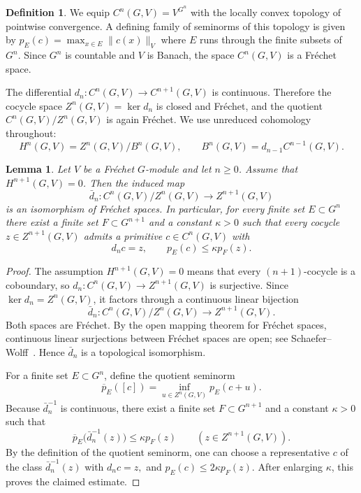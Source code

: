 \documentclass[12pt]{amsproc}
\theoremstyle{plain}
\newtheorem{lemma}[theorem]{Lemma}
\theoremstyle{definition}
\newtheorem{definition}[theorem]{Definition}
\numberwithin{equation}{section}
\begin{document}
\begin{definition}
We equip $C^n(G,V)=V^{G^n}$ with the locally convex topology of pointwise convergence. A defining family of seminorms of this topology is given by
$
p_{E}(c)=\max_{x\in E}\|c(x)\|_V
$
where $E$ runs through the finite subsets of $G^n$. Since $G^n$ is countable and $V$ is Banach, the space $C^n(G,V)$ is a Fr\'echet space.
\end{definition}

The differential $d_n\colon C^n(G,V)\to C^{n+1}(G,V)$ is continuous. Therefore the cocycle space $Z^n(G,V)=\ker d_n$ is closed and Fr\'echet, and the quotient $C^n(G,V)/Z^n(G,V)$ is again Fr\'echet. We use unreduced cohomology throughout:
\[
H^n(G,V)=Z^n(G,V)/B^n(G,V),
\qquad
B^n(G,V)=d_{n-1}C^{n-1}(G,V).
\]

\begin{lemma}\label{lem:openmapping}
Let $V$ be a Fr\'echet $G$-module and let $n\ge 0$. Assume that $H^{n+1}(G,V)=0$. Then the induced map
\[
\bar d_n\colon C^n(G,V)/Z^n(G,V)\to Z^{n+1}(G,V)
\]
is an isomorphism of Fr\'echet spaces. In particular, for every finite set $E\subset G^n$ there exist a finite set $F\subset G^{n+1}$ and a constant $\kappa>0$ such that every cocycle $z\in Z^{n+1}(G,V)$ admits a primitive $c\in C^n(G,V)$ with
\[
d_nc=z,
\qquad
p_E(c)\le \kappa p_F(z).
\]
\end{lemma}

\begin{proof}
The assumption $H^{n+1}(G,V)=0$ means that every $(n+1)$-cocycle is a coboundary, so $d_n\colon C^n(G,V)\to Z^{n+1}(G,V)$ is surjective. Since $\ker d_n=Z^n(G,V)$, it factors through a continuous linear bijection
\[
\bar d_n\colon C^n(G,V)/Z^n(G,V)\to Z^{n+1}(G,V).
\]
Both spaces are Fr\'echet. By the open mapping theorem for Fr\'echet spaces, continuous linear surjections between Fr\'echet spaces are open; see Schaefer--Wolff~\cite[Thm.~III.4.2]{SchaeferWolff1999}. Hence $\bar d_n$ is a topological isomorphism.

For a finite set $E\subset G^n$, define the quotient seminorm
\[
\overline p_E([c])=\inf_{u\in Z^n(G,V)} p_E(c+u).
\]
Because $\bar d_n^{-1}$ is continuous, there exist a finite set $F\subset G^{n+1}$ and a constant $\kappa>0$ such that
\[
\overline p_E\bigl(\bar d_n^{-1}(z)\bigr)\le \kappa p_F(z)
\qquad (z\in Z^{n+1}(G,V)).
\]
By the definition of the quotient seminorm, one can choose a representative $c$ of the class $\bar d_n^{-1}(z)$ with
$
d_nc=z,$ and $
p_E(c)\le 2\kappa p_F(z).
$
After enlarging $\kappa$, this proves the claimed estimate.
\end{proof}
\end{document}
